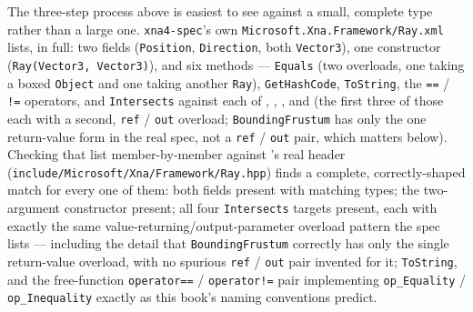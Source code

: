 The three-step process above is easiest to see against a small, complete type rather than a
large one. \texttt{xna4-spec}'s own
\texttt{Microsoft.Xna.Framework/Ray.xml} lists, in full: two fields (\texttt{Position},
\texttt{Direction}, both \texttt{Vector3}), one constructor (\texttt{Ray(Vector3, Vector3)}),
and six methods --- \texttt{Equals} (two overloads, one taking a boxed \texttt{Object} and one
taking another \texttt{Ray}), \texttt{GetHashCode}, \texttt{ToString}, the \texttt{==} / \texttt{!=}
operators, and \texttt{Intersects} against each of , ,
, and  (the first three of those each with a
second, \texttt{ref} / \texttt{out} overload; \texttt{BoundingFrustum} has only the one
return-value form in the real spec, not a \texttt{ref} / \texttt{out} pair, which matters below).
Checking that list member-by-member against 's real header
(\texttt{include/Microsoft/Xna/Framework/Ray.hpp}) finds a complete, correctly-shaped match for
every one of them: both fields present with matching types; the two-argument constructor
present; all four \texttt{Intersects} targets present, each with exactly the same
value-returning/output-parameter overload pattern the spec lists --- including the detail that
\texttt{BoundingFrustum} correctly has only the single return-value overload, with no spurious
\texttt{ref} / \texttt{out} pair invented for it; \texttt{ToString}, and the free-function
\texttt{operator==} / \texttt{operator!=} pair implementing \texttt{op\_Equality} /
\texttt{op\_Inequality} exactly as this book's naming conventions predict.

